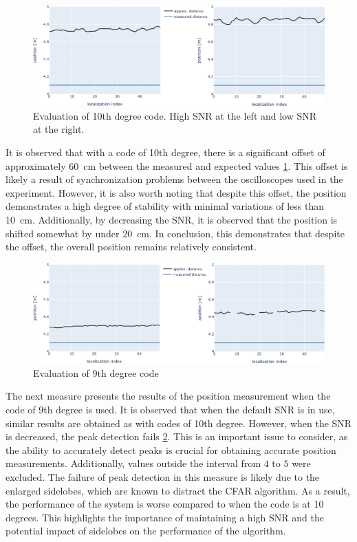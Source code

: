 \begin{figure}
	\includegraphics[width=\linewidth]{images/d10fvsd10fn} 
	\caption{Evaluation of 10th degree code. High SNR at the left and low SNR at the right.}
	\label{fig:d10fvsd10fn}
\end{figure}
It is observed that with a code of 10th degree, there is a significant offset of approximately \SI{60}{\centi\meter} between the measured and expected values \ref{fig:d10fvsd10fn}. This offset is likely a result of synchronization problems between the oscilloscopes used in the experiment. However, it is also worth noting that despite this offset, the position demonstrates a high degree of stability with minimal variations of less than \SI{10}{\centi\meter}. Additionally, by decreasing the SNR, it is observed that the position is shifted somewhat by under \SI{20}{\centi\meter}. In conclusion, this demonstrates that despite the offset, the overall position remains relatively consistent.
\begin{figure}
	\includegraphics[width=\linewidth]{images/d9fvsd9fn} 
	\caption{Evaluation of 9th degree code}
	\label{fig:d9fvsd9fn}
\end{figure}
The next measure presents the results of the position measurement when the code of 9th degree is used. It is observed that when the default SNR is in use, similar results are obtained as with codes of 10th degree. However, when the SNR is decreased, the peak detection fails \ref{fig:d9fvsd9fn}. This is an important issue to consider, as the ability to accurately detect peaks is crucial for obtaining accurate position measurements. Additionally, values outside the interval from $4$ to $5$ were excluded. The failure of peak detection in this measure is likely due to the enlarged sidelobes, which are known to distract the CFAR algorithm. As a result, the performance of the system is worse compared to when the code is at 10 degrees. This highlights the importance of maintaining a high SNR and the potential impact of sidelobes on the performance of the algorithm.

